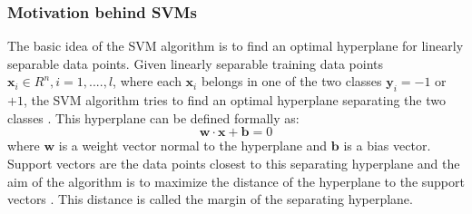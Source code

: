 \documentclass[a4paper,11pt,oneside]{article}
\begin{document}
\subsubsection*{Motivation behind SVMs}
The basic idea of the SVM algorithm is to find an optimal hyperplane for linearly separable data points.
Given linearly separable training data points $\mathbf{x}_i\in R^n,i=1,....,l$, where each $\mathbf{x}_i$
belongs in one of the two classes $\mathbf{y}_i=-1$ or $+1$, the SVM algorithm tries to find an optimal hyperplane
separating the two classes \cite{fletcher2009support}. This hyperplane can be defined formally as:
\begin{equation}
  \mathbf{w}\cdot\mathbf{x} + \mathbf{b} = 0
\end{equation} where $\mathbf{w}$ is a weight vector normal to the hyperplane and $\mathbf{b}$ is a bias vector.
Support vectors are the data points closest to this separating
hyperplane and the aim of the algorithm is to maximize the distance of the hyperplane to the support
vectors \cite{law2006simple}. This distance is called the margin of the separating hyperplane.
\end{document}
